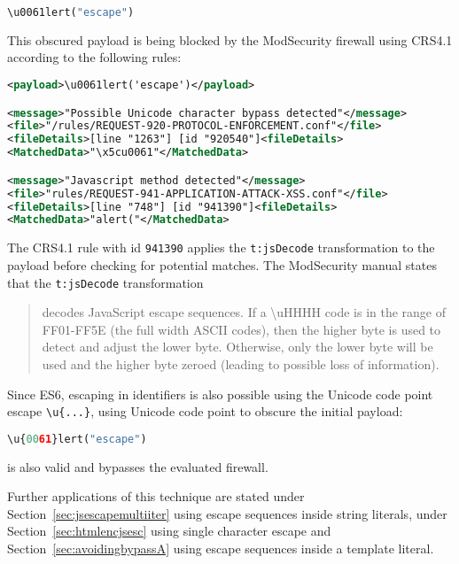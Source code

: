 \begin{lstlisting}[style=basicStyle, language=Python]
\u0061lert("escape")
\end{lstlisting}

This obscured payload is being blocked by the ModSecurity firewall using CRS4.1 according to the following rules:

\begin{lstlisting}[style=ruleStyle, language=XML, caption=\textbackslash u0061lert('escape') blocked]
<payload>\u0061lert('escape')</payload>

<message>"Possible Unicode character bypass detected"</message>
<file>"/rules/REQUEST-920-PROTOCOL-ENFORCEMENT.conf"</file>
<fileDetails>[line "1263"] [id "920540"]<fileDetails>
<MatchedData>"\x5cu0061"</MatchedData>

<message>"Javascript method detected"</message>
<file>"rules/REQUEST-941-APPLICATION-ATTACK-XSS.conf"</file>
<fileDetails>[line "748"] [id "941390"]<fileDetails>
<MatchedData>"alert("</MatchedData>
\end{lstlisting}

The CRS4.1 rule with id \verb|941390| applies the \verb|t:jsDecode| transformation to the payload before checking for potential matches. The ModSecurity manual states that the \verb|t:jsDecode| transformation

\begin{quote}
	decodes JavaScript escape sequences. If a \textbackslash uHHHH code is in the range of FF01-FF5E (the full width ASCII codes), then the higher byte is used to detect and adjust the lower byte. Otherwise, only the lower byte will be used and the higher byte zeroed (leading to possible loss of information). \cite{modsec/trans}
\end{quote}

Since ES6, escaping in identifiers is also possible using the Unicode code point escape \verb|\u{...}|, using Unicode code point to obscure the initial payload:

\begin{lstlisting}[style=basicStyle, language=Python, caption=\textbackslash u\{0061\}lert('escape') bypass]
\u{0061}lert("escape")
\end{lstlisting}

is also valid and bypasses the evaluated firewall.

Further applications of this technique are stated under Section~\ref{sec:jsescapemultiiter} using escape sequences inside string literals, under Section~\ref{sec:htmlencjsesc} using single character escape and Section~\ref{sec:avoidingbypassA} using escape sequences inside a template literal.

